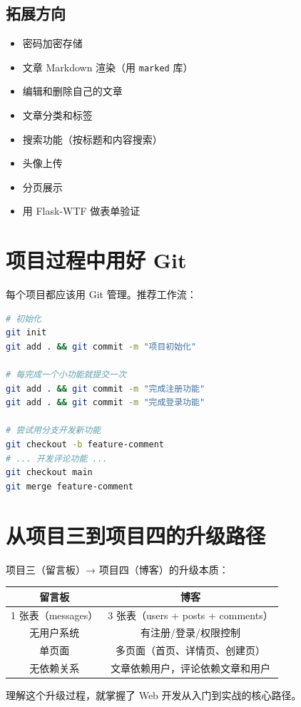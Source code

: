 \documentclass[a4paper,12pt]{ctexart}
\begin{document}
\subsection*{拓展方向}

\begin{itemize}
  \item 密码加密存储
  \item 文章 Markdown 渲染（用 \texttt{marked} 库）
  \item 编辑和删除自己的文章
  \item 文章分类和标签
  \item 搜索功能（按标题和内容搜索）
  \item 头像上传
  \item 分页展示
  \item 用 Flask-WTF 做表单验证
\end{itemize}

\section*{项目过程中用好 Git}

每个项目都应该用 Git 管理。推荐工作流：

\begin{lstlisting}[language=bash]
# 初始化
git init
git add . && git commit -m "项目初始化"

# 每完成一个小功能就提交一次
git add . && git commit -m "完成注册功能"
git add . && git commit -m "完成登录功能"

# 尝试用分支开发新功能
git checkout -b feature-comment
# ... 开发评论功能 ...
git checkout main
git merge feature-comment
\end{lstlisting}

\section*{从项目三到项目四的升级路径}

项目三（留言板）→ 项目四（博客）的升级本质：

\begin{center}
\begin{tabular}{|c|c|}
\hline
\textbf{留言板} & \textbf{博客} \\ \hline
1 张表（messages） & 3 张表（users + posts + comments） \\ \hline
无用户系统 & 有注册/登录/权限控制 \\ \hline
单页面 & 多页面（首页、详情页、创建页） \\ \hline
无依赖关系 & 文章依赖用户，评论依赖文章和用户 \\ \hline
\end{tabular}
\end{center}

理解这个升级过程，就掌握了 Web 开发从入门到实战的核心路径。
\end{document}
